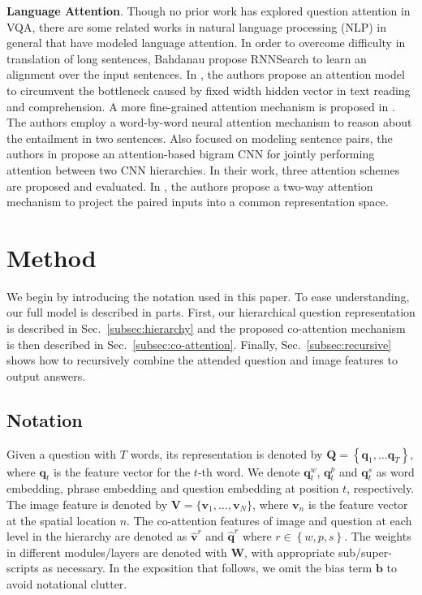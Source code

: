 \documentclass{article}
\begin{document}
\textbf{Language Attention}. Though no prior work has explored question attention in VQA, there are some related works in natural language processing (NLP) in general that have modeled language attention. In order to overcome difficulty in translation of long sentences, Bahdanau \etal \cite{bahdanau2014neural} propose RNNSearch to learn an alignment over the input sentences. In \cite{hermann2015teaching}, the authors propose an attention model to circumvent the bottleneck caused by fixed width hidden vector in text reading and comprehension. A more fine-grained attention mechanism is proposed in \cite{rocktaschel2015reasoning}. The authors employ a word-by-word neural attention mechanism to reason about the entailment in two sentences. Also focused on modeling sentence pairs, the authors in \cite{yin2015abcnn} propose an attention-based bigram CNN for jointly performing attention between two CNN hierarchies. In their work, three attention schemes are proposed and evaluated. In \cite{santos2016attentive}, the authors propose a two-way attention mechanism to project the paired inputs into a common representation space.
%
 \section{Method}
\label{sec:method}
\vspace*{-2mm}
We begin by introducing the notation used in this paper. To ease understanding, our full model is described in parts. First, our hierarchical question representation is described in Sec.~\ref{subsec:hierarchy} and the proposed co-attention mechanism is then described in Sec.~\ref{subsec:co-attention}. Finally, Sec.~\ref{subsec:recursive} shows how to recursively combine the attended question and image features to output answers.
\subsection{Notation}
Given a question with $T$ words, its representation is denoted by $\bm{Q}=\left\lbrace \bm{q}_1,\ldots \bm{q}_T \right\rbrace$, where $\bm{q}_t$ is the feature vector for the $t$-th word. We denote $\bm{q}^w_t$, $\bm{q}^p_t$ and $\bm{q}^s_t$ as word embedding, phrase embedding and question embedding at position $t$, respectively. 
The image feature is denoted by $\bm{{V}} = \{\bm{v}_1,...,\bm{v}_N\}$, where $\bm{v}_n$ is the feature vector at the spatial location $n$. The co-attention features of image and question at each level in the hierarchy are denoted as $\hat{\bm{v}}^r$ and $\hat{\bm{q}}^r$ where $r \in \left\lbrace w, p, s \right\rbrace $. The weights in different modules/layers are denoted with $\bm{W}$, with appropriate sub/super-scripts as necessary. In the exposition that follows, we omit the bias term $\bm{b}$ to avoid notational clutter.
\end{document}
